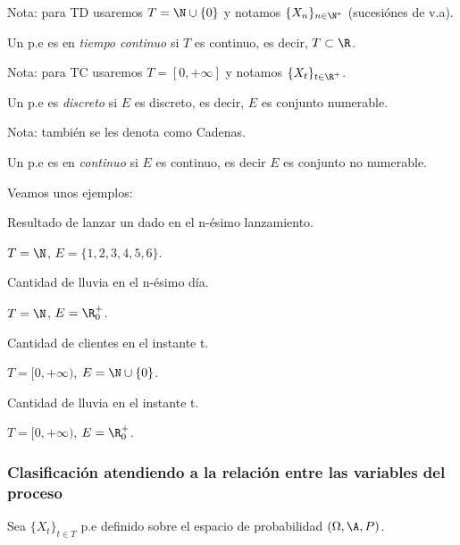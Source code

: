 Nota: para TD usaremos $T = \N \cup \{ 0 \}$ y notamos $\{X_n\}_{n \in \N^*}$ (sucesiónes de v.a).

\begin{ndef}
  Un p.e es en \emph{tiempo continuo} si $T$ es continuo, es decir, $T \subset \R$.
\end{ndef}

Nota: para TC usaremos $T = [0, +\infty]$ y notamos $\{X_t\}_{t \in \R^+}$.

\begin{ndef}
  Un p.e es \emph{discreto} si $E$ es discreto, es decir, $E$ es conjunto numerable.
\end{ndef}

Nota: también se les denota como Cadenas.

\begin{ndef}
  Un p.e es en \emph{continuo} si $E$ es continuo, es decir $E$ es conjunto no numerable.
\end{ndef}

Veamos unos ejemplos:

\begin{ejemplo}[PDTD]
  Resultado de lanzar un dado en el n-ésimo lanzamiento.

  $T = \N$, $E = \{1,2,3,4,5,6\}$.
\end{ejemplo}

\begin{ejemplo}[PCTD]
  Cantidad de lluvia en el n-ésimo día.

  $T = \N$, $E = \R^+_0$.
\end{ejemplo}

\begin{ejemplo}[PDTC]
  Cantidad de clientes en el instante t.

  $T = [0, +\infty)$, $E = \N \cup \{0\}$.
\end{ejemplo}

\begin{ejemplo}[PCTC]
  Cantidad de lluvia en el instante t.

  $T = [0, +\infty)$, $E = \R^+_0$.
\end{ejemplo}

\subsubsection{Clasificación atendiendo a la relación entre las variables del proceso}

Sea $\{X_t\}_{t \in T}$ p.e definido sobre el espacio de probabilidad $(\Omega, \A, P)$.

